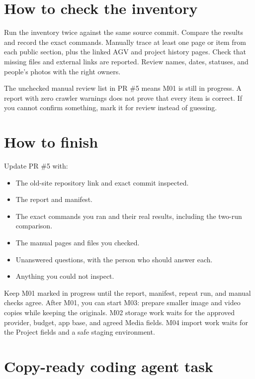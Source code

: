 \documentclass[11pt]{article}
\begin{document}
\section{How to check the inventory}

Run the inventory twice against the same source commit. Compare the results and record the exact commands. Manually trace at least one page or item from each public section, plus the linked AGV and project history pages. Check that missing files and external links are reported. Review names, dates, statuses, and people's photos with the right owners.

The unchecked manual review list in PR \#5 means M01 is still in progress. A report with zero crawler warnings does not prove that every item is correct. If you cannot confirm something, mark it for review instead of guessing.

\section{How to finish}

Update PR \#5 with:

\begin{itemize}
\item The old-site repository link and exact commit inspected.
\item The report and manifest.
\item The exact commands you ran and their real results, including the two-run comparison.
\item The manual pages and files you checked.
\item Unanswered questions, with the person who should answer each.
\item Anything you could not inspect.
\end{itemize}

Keep M01 marked in progress until the report, manifest, repeat run, and manual checks agree. After M01, you can start M03: prepare smaller image and video copies while keeping the originals. M02 storage work waits for the approved provider, budget, app base, and agreed Media fields. M04 import work waits for the Project fields and a safe staging environment.

\section{Copy-ready coding agent task}
\end{document}
